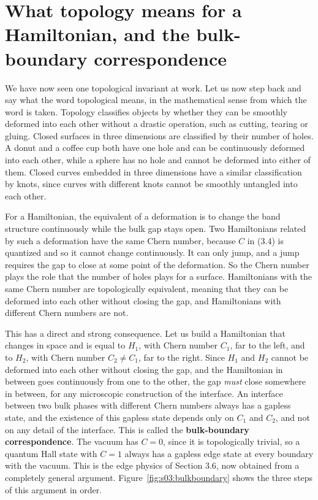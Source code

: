 \section{What topology means for a Hamiltonian, and the bulk-boundary correspondence}

We have now seen one topological invariant at work. Let us now step back and say what the word
topological means, in the mathematical sense from which the word is taken. Topology classifies
objects by whether they can be smoothly deformed into each other without a drastic operation, such as
cutting, tearing or gluing. Closed surfaces in three dimensions are classified by their number of holes. A
donut and a coffee cup both have one hole and can be continuously deformed into each other, while a
sphere has no hole and cannot be deformed into either of them. Closed curves embedded in three dimensions
have a similar classification by knots, since curves with different knots cannot be smoothly untangled into
each other.

For a Hamiltonian, the equivalent of a deformation is to change the band structure continuously while
the bulk gap stays open. Two Hamiltonians related by such a deformation have the same Chern number,
because $C$ in (3.4) is quantized and so it cannot change continuously. It can only jump, and a jump
requires the gap to close at some point of the deformation. So the Chern number plays the role that
the number of holes plays for a surface. Hamiltonians with the same Chern number are topologically
equivalent, meaning that they can be deformed into each other without closing the gap, and
Hamiltonians with different Chern numbers are not.

This has a direct and strong consequence. Let us build a Hamiltonian that changes in space and is
equal to $H_1$, with Chern number $C_1$, far to the left, and to $H_2$, with Chern number
$C_2 \neq C_1$, far to the right. Since $H_1$ and $H_2$ cannot be deformed into each other without
closing the gap, and the Hamiltonian in between goes continuously from one to the other, the gap
\emph{must} close somewhere in between, for any microscopic construction of the interface. An
interface between two bulk phases with different Chern numbers always has a gapless state, and the
existence of this gapless state depends only on $C_1$ and $C_2$, and not on any detail of the
interface. This is called the \textbf{bulk-boundary correspondence}. The vacuum has $C=0$, since it is
topologically trivial, so a quantum Hall state with $C=1$ always has a gapless edge state at every
boundary with the vacuum. This is the edge physics of Section 3.6, now obtained from a completely
general argument. Figure~\ref{fig:s03:bulkboundary} shows the three steps of this argument in order.

